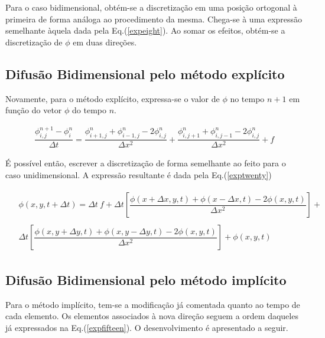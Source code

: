 \noindent

	Para o caso bidimensional, obtém-se a discretização em uma posição ortogonal à primeira de forma análoga ao procedimento da mesma. Chega-se à uma expressão semelhante àquela dada pela Eq.(\ref{expeight}). Ao somar os efeitos, obtém-se a discretização de $\phi$ em duas direções.
	
\subsection{Difusão Bidimensional pelo método explícito}

\noindent
	
	Novamente, para o método explícito, expressa-se o valor de $\phi$ no tempo $n+1$ em função do vetor $\phi$ do tempo $n$.
	
\begin{align}
\label{expnineteen}
\dfrac{\phi_{i,j}^{n+1} - \phi_{i}^{n}}{\Delta t} = \dfrac{\phi_{i+1,j}^{n} + \phi_{i-1,j}^{n} - 2 \phi_{i,j}^{n}}{\Delta x^2} + \dfrac{\phi_{i,j+1}^{n} + \phi_{i,j-1}^{n} - 2 \phi_{i,j}^{n}}{\Delta x^2} + f
\end{align}

	É possível então, escrever a discretização de forma semelhante ao feito para o caso unidimensional. A expressão resultante é dada pela Eq.(\ref{exptwenty})

\begin{align}
\label{exptwenty}
\begin{array}{cc}
&\phi(x,y,t+\Delta t) = \Delta t \ f + \Delta t \left[\dfrac{\phi(x + \Delta x,y,t) + \phi(x - \Delta x,t) - 2 \phi(x,y,t)}{\Delta x^2} \right] + \\
&\\
&\Delta t \left[\dfrac{\phi(x,y + \Delta y,t) + \phi(x,y- \Delta y,t) - 2 \phi(x,y,t)}{\Delta x^2} \right] + \phi(x,y,t)
\end{array}
\end{align}

\subsection{Difusão Bidimensional pelo método implícito}

\noindent
	
	Para o método implícito, tem-se a modificação já comentada quanto ao tempo de cada elemento. Os elementos associados à nova direção seguem a ordem daqueles já expressados na Eq.(\ref{expfifteen}). O desenvolvimento é apresentado a seguir.
	
